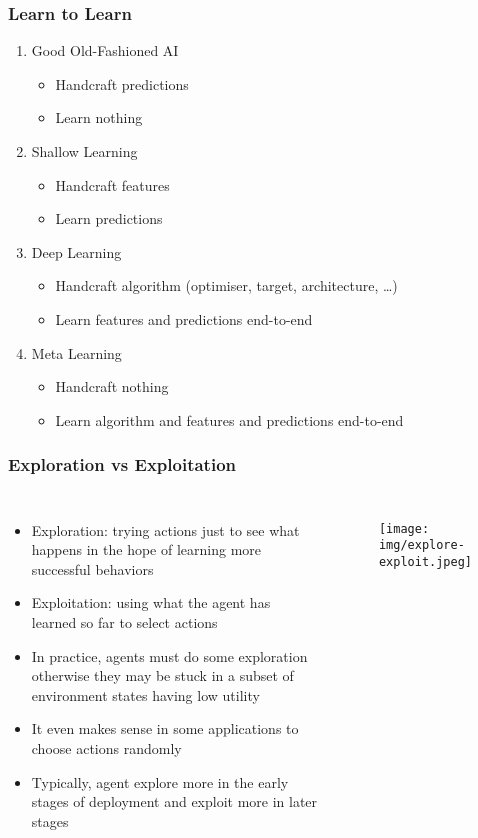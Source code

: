 \documentclass[UTF8,11pt,colorlinks,compress,openany]{beamer}%
\begin{document}
\begin{frame}\frametitle{Learn to Learn}
\begin{enumerate}
	\item Good Old-Fashioned AI
		\begin{itemize}
			\item Handcraft predictions
			\item Learn nothing
		\end{itemize}
	\item Shallow Learning
		\begin{itemize}
			\item Handcraft features
			\item Learn predictions
		\end{itemize}
	\item Deep Learning
		\begin{itemize}
			\item Handcraft algorithm (optimiser, target, architecture, \dots)
			\item Learn features and predictions end-to-end
			\end{itemize}
	\item Meta Learning
		\begin{itemize}
			\item Handcraft nothing
			\item Learn algorithm and features and predictions end-to-end
		\end{itemize}
\end{enumerate}
\end{frame}

\begin{frame}\frametitle{Exploration vs Exploitation}
\begin{columns}
\begin{itemize}
	\item Exploration: trying actions just to see what happens in the hope of learning more successful behaviors
	\item Exploitation: using what the agent has learned so far to select actions
	\item In practice, agents must do some exploration otherwise they may be stuck in a subset of environment states having low utility
	\item It even makes sense in some applications to choose actions randomly
	\item Typically, agent explore more in the early stages of deployment and exploit more in later stages
\end{itemize}
\begin{figure}[H]
\texttt{[image: img/explore-exploit.jpeg]}
\end{figure}
\end{columns}
\end{frame}
\end{document}

